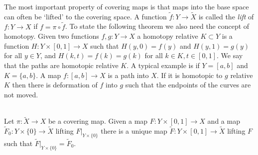 The most important property of covering maps is that maps into the base space can often be `lifted' to the covering space.
A function $\tilde{f} : Y \to \tilde{X}$ is called the \emph{lift} of $f : Y \to X$ if $f = \pi \circ \tilde{f}$.
To state the following theorem we also need the concept of homotopy.
Given two functions $f,g : Y \to X$ a homotopy relative $K \subset Y$ is a function $H : Y \times [0,1] \to X$ such that $H(y,0) = f(y)$ and $H(y,1) = g(y)$ for all $y \in Y$, and $H(k,t) = f(k) = g(k)$ for all $k\in K, t\in[0,1]$.
We say that the paths are homotopic relative $K$.
A typical example is if $Y = [a,b]$ and $K = \{a,b\}$.
A map $f : [a,b] \to X$ is a path into $X$.
If it is homotopic to $g$ relative $K$ then there is deformation of $f$ into $g$ such that the endpoints of the curves are not moved.

\begin{theorem}
\label{thm:homotopy lifting property}
\textup{\cite[Thm~3.23]{Warner1983}\cite[Thm~1.7(c)]{Hatcher}}\\
Let $\pi : \tilde{X} \to X$ be a covering map.
Given a map $F : Y \times [0,1] \to X$ and a map $\tilde{F}_0 : Y \times \{0\} \to \tilde{X}$ lifting $F|_{Y \times \{0\}}$ there is a unique map $\tilde{F} : Y \times [0,1] \to \tilde{X}$ lifting $F$ such that $\tilde{F}|_{Y \times \{0\}} = \tilde{F}_0$.
\end{theorem}
